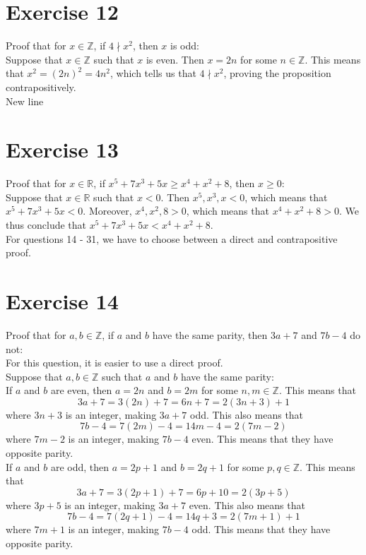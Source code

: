 \documentclass[12pt]{article}
\newcommand{\Z}{\mathbb{Z}}
\newcommand{\R}{\mathbb{R}}
\begin{document}
    \section*{Exercise 12}
    Proof that for $x \in \Z$,
    if $4 \nmid x^2$,
    then $x$ is odd: \\
    Suppose that $x \in \Z$
    such that $x$ is even.
    Then $x = 2n$ for some $n \in \Z$.
    This means that $x^2 = (2n)^2 = 4n^2$,
    which tells us that $4 \nmid x^2$,
    proving the proposition contrapositively. \\
New line

    \section*{Exercise 13}
    Proof that for $x \in \R$,
    if $x^5 + 7x^3 + 5x \geqslant x^4 + x^2 + 8$,
    then $x \geqslant 0$: \\
    Suppose that $x \in \R$
    such that $x < 0$.
    Then $x^5, x^3, x < 0$,
    which means that $x^5 + 7x^3 + 5x < 0$.
    Moreover,
    $x^4, x^2, 8 > 0$,
    which means that $x^4 + x^2 + 8 > 0$.
    We thus conclude that $x^5 + 7x^3 + 5x < x^4 + x^2 + 8$. \\

    For questions 14 - 31, we have to choose between a direct
    and contrapositive proof. \\

    \section*{Exercise 14}
    Proof that for $a, b \in \Z$,
    if $a$ and $b$ have the same parity,
    then $3a + 7$ and $7b - 4$ do not: \\
    For this question, it is easier to use a direct proof. \\
    Suppose that $a, b \in \Z$
    such that $a$ and $b$ have the same parity: \\
    If $a$ and $b$ are even,
    then $a = 2n$ and $b = 2m$ for some $n, m \in \Z$.
    This means that
    \[ 3a + 7 = 3(2n) + 7 = 6n + 7 = 2(3n + 3) + 1 \]
    where $3n + 3$ is an integer,
    making $3a + 7$ odd.
    This also means that
    \[ 7b - 4 = 7(2m) - 4 = 14m - 4 = 2(7m - 2) \]
    where $7m - 2$ is an integer,
    making $7b - 4$ even.
    This means that they have opposite parity. \\
    If $a$ and $b$ are odd,
    then $a = 2p + 1$ and $b = 2q + 1$ for some $p, q \in \Z$.
    This means that
    \[ 3a + 7 = 3(2p + 1) + 7 = 6p + 10 = 2(3p + 5) \]
    where $3p + 5$ is an integer,
    making $3a + 7$ even.
    This also means that
    \[ 7b - 4 = 7(2q + 1) - 4 = 14q + 3 = 2(7m + 1) + 1 \]
    where $7m + 1$ is an integer,
    making $7b - 4$ odd.
    This means that they have opposite parity. \\
\end{document}
